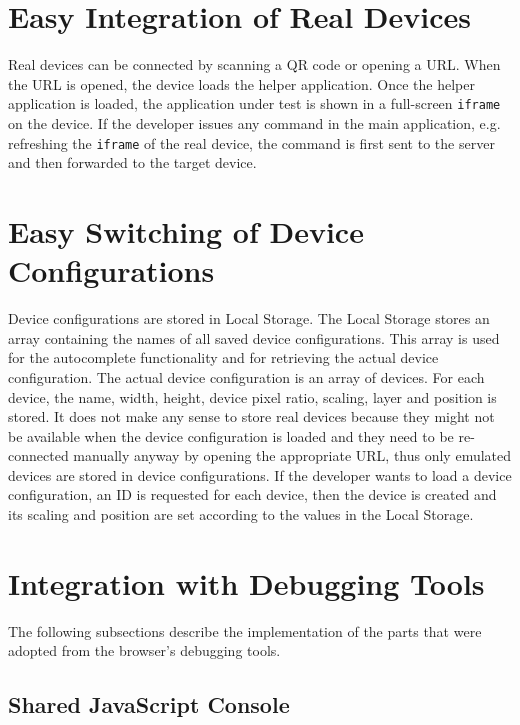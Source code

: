 \section{Easy Integration of Real Devices}

Real devices can be connected by scanning a QR code or opening a URL. When the URL is opened, the device loads the helper application. Once the helper application is loaded, the application under test is shown in a full-screen \lstinline|iframe| on the device. If the developer issues any command in the main application, e.g. refreshing the \lstinline|iframe| of the real device, the command is first sent to the server and then forwarded to the target device. 

\section{Easy Switching of Device Configurations}

Device configurations are stored in Local Storage. The Local Storage stores an array containing the names of all saved device configurations. This array is used for the autocomplete functionality and for retrieving the actual device configuration. The actual device configuration is an array of devices. For each device, the name, width, height, device pixel ratio, scaling, layer and position is stored. It does not make any sense to store real devices because they might not be available when the device configuration is loaded and they need to be re-connected manually anyway by opening the appropriate URL, thus only emulated devices are stored in device configurations. If the developer wants to load a device configuration, an ID is requested for each device, then the device is created and its scaling and position are set according to the values in the Local Storage.

\section{Integration with Debugging Tools}

The following subsections describe the implementation of the parts that were adopted from the browser's debugging tools.

\subsection{Shared JavaScript Console}

